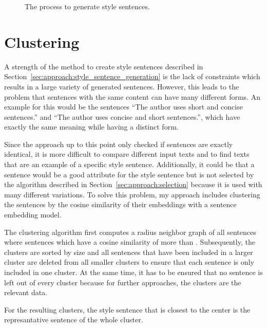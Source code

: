 \begin{figure}[ht]
  
  \caption{The process to generate style sentences.}
  \label{fig:style_sentence_generation}
\end{figure}


\section{Clustering}
\label{sec:approach:clustering}
A strength of the method to create style sentences described in Section~\ref{sec:approach:style_sentence_generation} is the lack of constraints which results in a large variety of generated sentences. However, this leads to the problem that sentences with the same content can have many different forms. An example for this would be the sentences \enquote{The author uses short and concise sentences.} and \enquote{The author uses concise and short sentences.}, which have exactly the same meaning while having a distinct form.

Since the approach up to this point only checked if sentences are exactly identical, it is more difficult to compare different input texts and to find texts that are an example of a specific style sentence. Additionally, it could be that a sentence would be a good attribute for the style sentence but is not selected by the algorithm described in Section~\ref{sec:approach:selection} because it is used with many different variations.
To solve this problem, my approach includes clustering the sentences by the cosine similarity of their embeddings with a sentence embedding model. %

The clustering algorithm first computes a radius neighbor graph of all sentences where sentences which have a cosine similarity of more than \minCosineSimilarity{}. Subsequently, the clusters are sorted by size and all sentences that have been included in a larger cluster are deleted from all smaller clusters to ensure that each sentence is only included in one cluster. At the same time, it has to be ensured that no sentence is left out of every cluster because for further approaches, the clusters are the relevant data.

For the resulting clusters, the style sentence that is closest to the center is the represantative sentence of the whole cluster.



